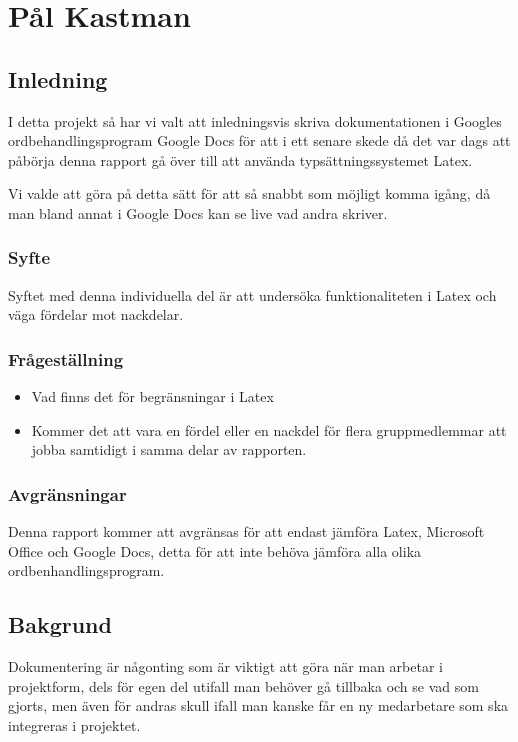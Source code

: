 \section{Pål Kastman}
\subsection{Inledning}
I detta projekt så har vi valt att inledningsvis skriva dokumentationen i Googles ordbehandlingsprogram Google Docs för att 
i ett senare skede då det var dags att påbörja denna rapport gå över till att använda typsättningssystemet Latex. 

Vi valde att göra på detta sätt för att så snabbt som möjligt komma igång, då man bland annat i Google Docs kan se live 
vad andra skriver.

\subsubsection{Syfte}
Syftet med denna individuella del är att undersöka funktionaliteten i Latex och väga fördelar mot nackdelar.

\subsubsection{Frågeställning}
\begin{itemize}
\item Vad finns det för begränsningar i Latex
\item Kommer det att vara en fördel eller en nackdel för flera gruppmedlemmar att jobba samtidigt i samma delar av rapporten.
\end{itemize}

\subsubsection{Avgränsningar}
Denna rapport kommer att avgränsas för att endast jämföra Latex, Microsoft Office och Google Docs, detta för att 
inte behöva jämföra alla olika ordbenhandlingsprogram.

\subsection{Bakgrund}
Dokumentering är någonting som är viktigt att göra när man arbetar i projektform, dels för egen del utifall man behöver 
gå tillbaka och se vad som gjorts, men även för andras skull ifall man kanske får en ny medarbetare som ska integreras i 
projektet.

